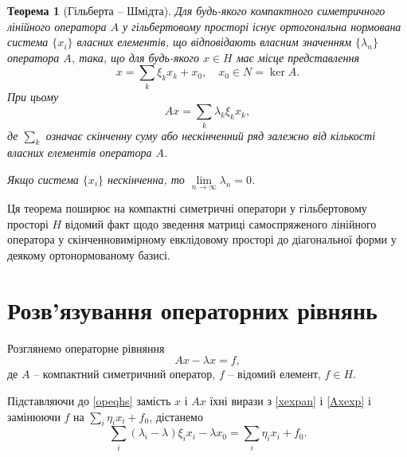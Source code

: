 \documentclass[14pt,twoside]{extreport}
\theoremstyle{mystyle}
\newtheorem{thm}{Теорема}
\numberwithin{equation}{chapter}
\begin{document}
\begin{thm}[Гільберта -- Шмідта] Для будь-якого компактного симетричного лінійного оператора $A$ у гільбертовому просторі існує ортогональна нормована система $\{x_i\}$ власних елементів, що відповідають власним значенням $\{\lambda_n\}$ оператора $A$, така, що для будь-якого $x \in H$ має місце представлення
\begin{equation}\label{xexpan}
 x= \sum_{k} \xi_k x_k + x_0, \quad x_0 \in N = \ker A.
\end{equation}
При цьому
\begin{equation}\label{Axexp}
 Ax = \sum_{k} \lambda_k \xi_k x_k,
\end{equation}
де $\sum\limits_{k}$ означає скінченну суму або нескінченний ряд залежно від кількості власних елементів оператора $A$.

Якщо система $\{x_i\}$ нескінченна, то $\lim\limits_{n\to\infty} \lambda_n = 0$.
\end{thm}

Ця теорема поширює на компактні симетричні оператори у гільбертовому просторі $H$ відомий факт щодо зведення матриці самоспряженого лінійного оператора у скінченновимірному евклідовому просторі до діагональної форми у деякому ортонормованому базисі.

\section{Розв'язування операторних рівнянь}

Розглянемо операторне рівняння
\begin{equation}\label{opeqhs}
 Ax - \lambda x =f,
\end{equation}
де $A$ -- компактний симетричний оператор, $f$ -- відомий елемент, $f \in H$.

Підставляючи до \eqref{opeqhs} замість $x$ і $Ax$ їхні вирази з \eqref{xexpan} і \eqref{Axexp} і замінюючи $f$ на $\sum\limits_{i} \eta_i x_i + f_0$, дістанемо
\begin{equation}\label{expeq}
 \sum_{i} (\lambda_i - \lambda)\xi_i x_i - \lambda x_0 = \sum_{i} \eta_i x_i + f_0.
\end{equation}
\end{document}
